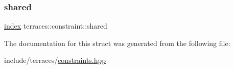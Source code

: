 \subsubsection{\texorpdfstring{shared}{shared}}
{\footnotesize\ttfamily \hyperlink{namespaceterraces_adbc33ccb543d1634e96d0eb02e472c77}{index} terraces\+::constraint\+::shared}



The documentation for this struct was generated from the following file\+:\begin{DoxyCompactItemize}
\item 
include/terraces/\hyperlink{constraints_8hpp}{constraints.\+hpp}\end{DoxyCompactItemize}
